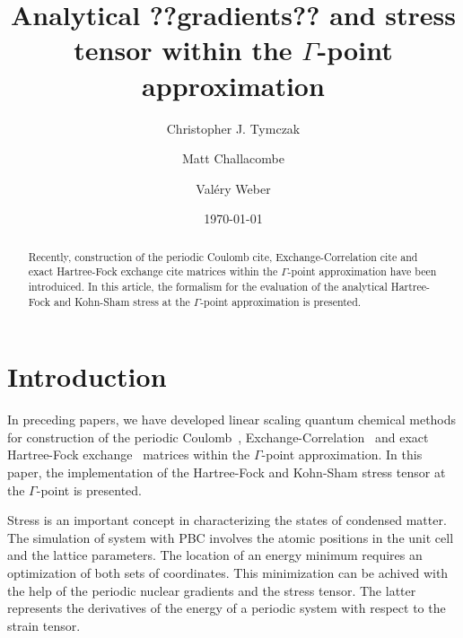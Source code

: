 \documentclass[pra,aps,twocolumn,showkeys,twocolumngrid,superbib]{revtex4}
\begin{document}

\title{Analytical ??gradients?? and stress tensor within the $\Gamma$-point approximation}

\author{Christopher J. Tymczak}%
\author{Matt Challacombe}%
%
\author{Val\'ery Weber}
%


\date{\today}%

\begin{abstract}
  Recently, construction of the periodic Coulomb cite, Exchange-Correlation cite 
  and exact Hartree-Fock exchange cite matrices within the $\Gamma$-point approximation
  have been introduiced. In this article, the formalism for the evaluation of 
  the analytical Hartree-Fock and Kohn-Sham stress at the $\Gamma$-point approximation is
  presented. 
\end{abstract}

\maketitle

\section{Introduction}

In preceding papers, we have developed linear scaling quantum chemical methods
for construction of the periodic Coulomb~\cite{CTymczak03a}, 
Exchange-Correlation~\cite{CTymczak03a} and 
exact Hartree-Fock exchange~\cite{CTymczak03b} matrices within the $\Gamma$-point approximation. 
In this paper, the implementation of the Hartree-Fock
and Kohn-Sham stress tensor at the $\Gamma$-point is presented.

Stress is an important concept in characterizing the states of condensed
matter. The simulation of system with PBC involves the atomic positions 
in the unit cell and the lattice parameters. The location of an energy minimum 
requires an optimization of both sets of coordinates. This minimization can be
achived with the help of the periodic nuclear gradients and the stress tensor.
The latter represents the derivatives of the energy of a periodic system 
with respect to the strain tensor.
\end{document}

